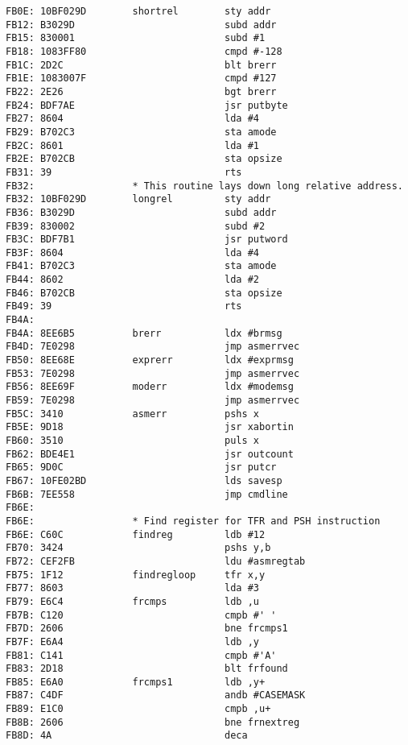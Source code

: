 {\begin{verbatim}
FB0E: 10BF029D        shortrel        sty addr
FB12: B3029D                          subd addr
FB15: 830001                          subd #1
FB18: 1083FF80                        cmpd #-128
FB1C: 2D2C                            blt brerr
FB1E: 1083007F                        cmpd #127
FB22: 2E26                            bgt brerr
FB24: BDF7AE                          jsr putbyte
FB27: 8604                            lda #4
FB29: B702C3                          sta amode
FB2C: 8601                            lda #1
FB2E: B702CB                          sta opsize
FB31: 39                              rts
FB32:                 * This routine lays down long relative address.
FB32: 10BF029D        longrel         sty addr
FB36: B3029D                          subd addr
FB39: 830002                          subd #2
FB3C: BDF7B1                          jsr putword
FB3F: 8604                            lda #4
FB41: B702C3                          sta amode
FB44: 8602                            lda #2
FB46: B702CB                          sta opsize
FB49: 39                              rts
FB4A:                 
FB4A: 8EE6B5          brerr           ldx #brmsg
FB4D: 7E0298                          jmp asmerrvec 
FB50: 8EE68E          exprerr         ldx #exprmsg
FB53: 7E0298                          jmp asmerrvec
FB56: 8EE69F          moderr          ldx #modemsg
FB59: 7E0298                          jmp asmerrvec
FB5C: 3410            asmerr          pshs x
FB5E: 9D18                            jsr xabortin
FB60: 3510                            puls x
FB62: BDE4E1                          jsr outcount
FB65: 9D0C                            jsr putcr
FB67: 10FE02BD                        lds savesp
FB6B: 7EE558                          jmp cmdline
FB6E:                 
FB6E:                 * Find register for TFR and PSH instruction
FB6E: C60C            findreg         ldb #12
FB70: 3424                            pshs y,b
FB72: CEF2FB                          ldu #asmregtab
FB75: 1F12            findregloop     tfr x,y
FB77: 8603                            lda #3
FB79: E6C4            frcmps          ldb ,u
FB7B: C120                            cmpb #' '
FB7D: 2606                            bne frcmps1
FB7F: E6A4                            ldb ,y
FB81: C141                            cmpb #'A'
FB83: 2D18                            blt frfound
FB85: E6A0            frcmps1         ldb ,y+
FB87: C4DF                            andb #CASEMASK
FB89: E1C0                            cmpb ,u+
FB8B: 2606                            bne frnextreg
FB8D: 4A                              deca

\end{verbatim}}

